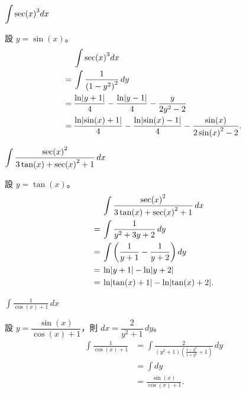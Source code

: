 \documentclass{beamer}
\newcommand{\Left} {\mathopen{}\mathclose\bgroup\left}
\newcommand{\Right}{\aftergroup\egroup\right}
\theoremstyle{remark}
\begin{document}
\begin{frame}{$\displaystyle \int \sec \Left( x \Right)^3 dx$}
  \begin{solution}
    設 $y = \sin(x)$。
    \begin{align*}
	 & \int \sec \Left( x \Right)^3 dx\\
      =\:& \int \frac{1}{\left( 1 - y^2 \right)^2}\,dy\\
      =\:& \frac{\ln \Left| y + 1 \Right|}{4} - \frac{\ln \Left| y - 1 \Right|}{4} - \frac{y}{2y^2 - 2}\\
      =\:& \frac{\ln \Left| \sin(x) + 1 \Right|}{4} - \frac{\ln \Left| \sin(x) - 1 \Right|}{4} 
	  - \frac{\sin(x)}{2 \sin \Left( x \Right)^2 - 2}.
    \end{align*}
  \end{solution}
\end{frame}

\begin{frame}{$\displaystyle \int \frac{\sec \Left( x \Right)^2}{3\tan(x) + \sec \Left( x \Right)^2 + 1}\,dx$}
  \begin{solution}
    設 $y = \tan(x)$。
    \begin{align*}
	 & \int \frac{\sec \Left( x \Right)^2}{3\tan(x) + \sec \Left( x \Right)^2 + 1}\,dx\\
      =\:& \int \frac{1}{y^2 + 3y + 2}\,dy\\
      =\:& \int \left( \frac{1}{y+1} - \frac{1}{y+2} \right) dy\\
      =\:& \ln \Left| y+1 \Right| - \ln \Left| y+2 \Right|\\
      =\:& \ln \Left| \tan(x) + 1 \Right| - \ln \Left| \tan(x) + 2 \Right|.
    \end{align*}
  \end{solution}
\end{frame}

\begin{frame}{$\displaystyle \int \frac{1}{\cos(x) + 1}\,dx$}
  \begin{solution}
    設 $y = \dfrac{\sin(x)}{\cos(x) + 1}$，則 $dx = \dfrac{2}{y^2 + 1}\,dy$。
    \begin{align*}
      \int \frac{1}{\cos(x) + 1} &= \int \frac{2}{\left( y^2 + 1 \right) \left( \frac{1-y^2}{1+y^2} + 1 \right)}\,dy\\
	&= \int dy\\
	&= \frac{\sin(x)}{\cos(x) + 1}.
    \end{align*}
  \end{solution}
\end{frame}
\end{document}
